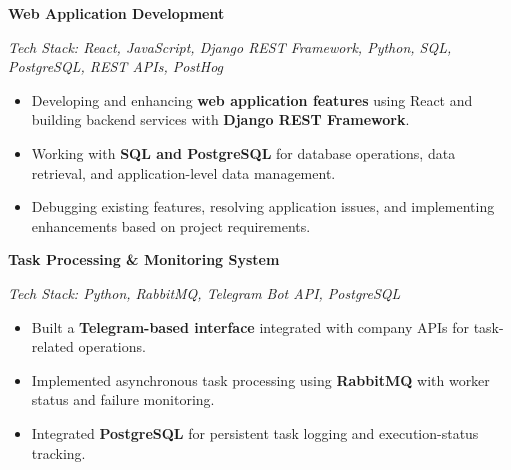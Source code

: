 \documentclass[a4paper,11pt]{article}
\begin{document}
\noindent
\textbf{Web Application Development}

\vspace{1pt}

\noindent
\small{\textit{Tech Stack: React, JavaScript, Django REST Framework, Python, SQL, PostgreSQL, REST APIs, PostHog}}

\vspace{1pt}

\begin{itemize}

\item Developing and enhancing \textbf{web application features} using React and building backend services with \textbf{Django REST Framework}.

\item Working with \textbf{SQL and PostgreSQL} for database operations, data retrieval, and application-level data management.

\item Debugging existing features, resolving application issues, and implementing enhancements based on project requirements.

\end{itemize}

\vspace{1pt}

\noindent
\textbf{Task Processing \& Monitoring System}

\vspace{1pt}

\noindent
\small{\textit{Tech Stack: Python, RabbitMQ, Telegram Bot API, PostgreSQL}}

\vspace{1pt}

\begin{itemize}

\item Built a \textbf{Telegram-based interface} integrated with company APIs for task-related operations.

\item Implemented asynchronous task processing using \textbf{RabbitMQ} with worker status and failure monitoring.

\item Integrated \textbf{PostgreSQL} for persistent task logging and execution-status tracking.

\end{itemize}

\end{document}
